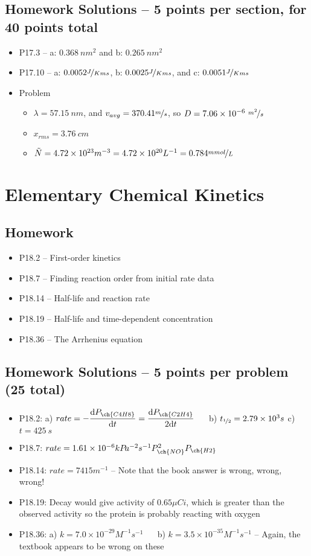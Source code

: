 \documentclass[12pt, openany, letterpaper]{memoir}
\begin{document}
\section*{Homework Solutions -- 5 points per section, for 40 points total}
\begin{itemize}
	\item P17.3 --  a: $0.368~nm^2$ and b: $0.265~nm^2$	
	\item P17.10 -- a: $0.0052\nicefrac{J}{Kms}$, b: $0.0025\nicefrac{J}{Kms}$, and c: $0.0051\nicefrac{J}{Kms}$	
	\item {} Problem
	\begin{itemize}
		\item $\lambda = 57.15~nm$, and $v_{avg}=370.41\nicefrac{m}{s}$, so $D=7.06\times10^{-6}~\nicefrac{m^2}{s}$
		\item $x_{rms}=3.76~cm$
		\item $\tilde{N}=4.72\times10^{23}m^{-3} = 4.72\times10^{20}L^{-1} = 0.784\nicefrac{mmol}{L}$
	\end{itemize}
\end{itemize}

\chapter{Elementary Chemical Kinetics}
\section*{Homework}
\begin{itemize}
	\item P18.2 -- First-order kinetics
	\item P18.7 -- Finding reaction order from initial rate data
	\item P18.14 -- Half-life and reaction rate
	\item P18.19 -- Half-life and time-dependent concentration
	\item P18.36 -- The Arrhenius equation
\end{itemize}
\section*{Homework Solutions -- 5 points per problem (25 total)}
\begin{itemize}
	\item P18.2: a) $rate = -\dfrac{\mathrm{d}P_{\ch{C4H8}}}{\mathrm{d}t}=\dfrac{\mathrm{d}P_{\ch{C2H4}}}{2\mathrm{d}t}$ ~~ b) $t_{\nicefrac{1}{2}}=2.79\times10^{3}s$ c) ~~ $t = 425~s$
	\item P18.7: $rate = 1.61\times10^{-6}kP\!a^{-2}s^{-1}P_{\ch{NO}}^2P_{\ch{H2}}$
	\item P18.14: $rate = 7415m^{-1}$ -- Note that the book answer is wrong, wrong, wrong!
	\item P18.19: Decay would give activity of $0.65 \mu Ci$, which is greater than the observed activity so the protein is probably reacting with oxygen
	\item P18.36: a) $k=7.0\times10^{-29}M^{-1}s^{-1}$ ~~ b) $k=3.5\times10^{-35}M^{-1}s^{-1}$ -- Again, the textbook appears to be wrong on these
\end{itemize}
\end{document}

